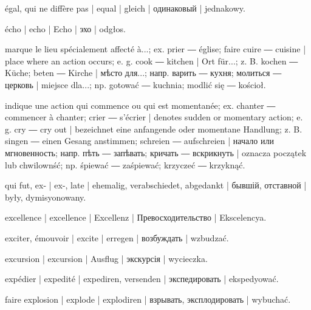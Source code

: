 \begin{outdent}{1em}
égal, qui ne diffère pas | equal | gleich | одинаковый | jednakowy.

écho | echo | Echo | эхо | odgłos.

marque le lieu spécialement affecté à...; ex.  prier ―
 église;  faire cuire ―  cuisine | place
where an action occurs; e. g.  cook ―  kitchen | Ort für...; z. B.  kochen ―  Küche;  beten
―  Kirche | мѣсто для...; напр.  варить ―
 кухня;  молиться ―  церковь | miejsce
dla...; np.  gotować ―  kuchnia;  modlić się
―  kościoł.

indique une action qui commence ou qui est momentanée;
ex.  chanter ―  commencer à chanter;  crier
―  s’écrier | denotes sudden or momentary action;
e. g.  cry ―  cry out | bezeichnet eine anfangende
oder momentane Handlung; z. B.  singen ―  einen
Gesang anstimmen;  schreien ―  aufschreien | начало
или мгновенность; напр.  пѣть ―  запѣвать; 
кричать ―  вскрикнуть | oznacza początek lub chwilownść;
np.  śpiewać ―  zaśpiewać;  krzyczeć ―
 krzyknąć.

qui fut, ex- | ex-, late | ehemalig, verabschiedet, abgedankt | бывшій, отставной | były, dymisyonowany.

excellence | excellence | Excellenz | Превосходительство | Ekscelencya.

exciter, émouvoir | excite | erregen | возбуждать | wzbudzać.

excursion | excursion | Ausflug | экскурсія | wycieczka.

expédier | expedité | expediren, versenden | экспедировать | ekspedyować.

faire explosion | explode | explodiren | взрывать,
эксплодировать | wybuchać.


\end{outdent}
